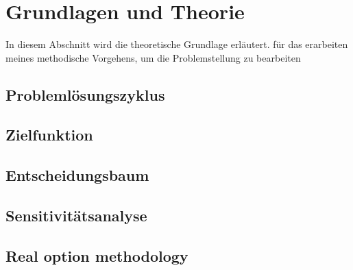 %
%            
%
%
%

\chapter{Grundlagen und Theorie}
\label{chap:Grundlage}

In diesem Abschnitt wird die theoretische Grundlage erläutert. für das erarbeiten meines methodische Vorgehens, um die Problemstellung zu bearbeiten

\section{Problemlösungszyklus}
\label{sec:Problemzyklus}



\section{Zielfunktion}
\label{sec:Zielf}


\section{Entscheidungsbaum}
\label{sec:Decisiontree}


\section{Sensitivitätsanalyse}
\label{sec:Sensitivität}


\section{Real option methodology}
\label{sec:RealOption}


%

